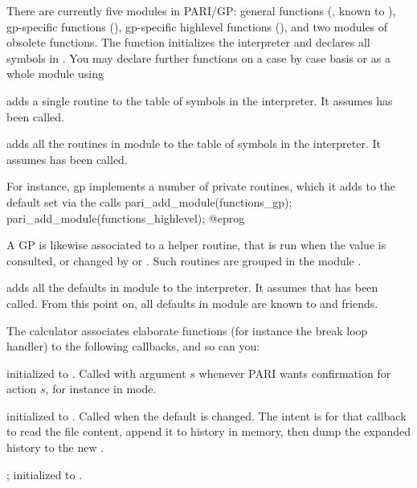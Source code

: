 There are currently five modules in PARI/GP: general functions
(, known to ), gp-specific functions
(), gp-specific highlevel functions
(), and two modules of obsolete functions. The
function  initializes the interpreter and declares all
symbols in . You may declare further functions on a
case by case basis or as a whole module using

 adds a single routine to the
table of symbols in the interpreter. It assumes  has been
called.

 adds all the routines in module
 to the table of symbols in the interpreter. It assumes
 has been called.

\noindent For instance, gp implements a number of private routines, which
it adds to the default set via the calls
\bprog
  pari_add_module(functions_gp);
  pari_add_module(functions_highlevel);
@eprog

A GP  is likewise associated to a helper routine, that is run
when the value is consulted, or changed by  or .
Such routines are grouped in the module .

 adds all the defaults in
module  to the interpreter. It assumes that  has
been called. From this point on, all defaults in module  are known
to  and friends.


The  calculator associates elaborate functions (for instance the
break loop handler) to the following callbacks, and so can you:

initialized to . Called with argument $s$ whenever PARI wants
confirmation for action $s$, for instance in  mode.

initialized to . Called when the  default
is changed. The intent is for that callback to read the file content, append
it to history in memory, then dump the expanded history to the new
.

;
initialized to .

